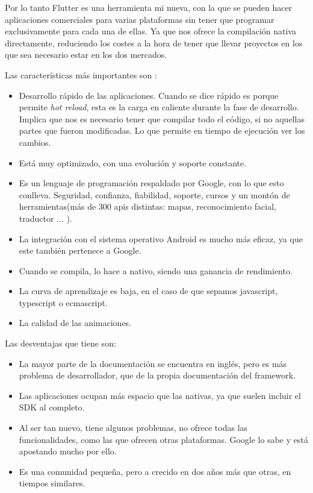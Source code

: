 Por lo tanto Flutter es una herramienta mi nueva, con la que se pueden hacer aplicaciones comerciales para varias plataformas sin tener que programar exclusivamente para cada una de ellas. Ya que nos ofrece la compilación nativa directamente, reduciendo los costes a la hora de tener que llevar proyectos en los que sea necesario estar en los dos mercados.

Las características más importantes son : 

\begin{itemize}
	\item Desarrollo rápido de las aplicaciones. Cuando se dice rápido es porque permite \emph{hot reload}, esta es la carga en caliente durante la fase de desarrollo. Implica que nos es necesario tener que compilar todo el código, si no aquellas partes que fueron modificadas. Lo que permite en tiempo de ejecución ver los cambios.
	\item Está muy optimizado, con una evolución y soporte constante.
	\item Es un lenguaje de programación respaldado por Google, con lo que esto conlleva. Seguridad, confianza, fiabilidad, soporte, cursos y un montón de herramientas(más de 300 apis distintas: mapas, reconocimiento facial, traductor ... ).
	\item La integración con el sistema operativo Android es mucho más eficaz, ya que este también pertenece a Google.
	\item Cuando se compila, lo hace a nativo, siendo una ganancia de rendimiento.
	\item La curva de aprendizaje es baja, en el caso de que sepamos javascript, typescript o ecmascript.
	\item La calidad de las animaciones.
\end{itemize}

Las desventajas que tiene son:
\begin{itemize}
	\item La mayor parte de la documentación se encuentra en inglés, pero es más problema de desarrollador, que de la propia documentación del framework.
	\item Las aplicaciones ocupan más espacio que las nativas, ya que suelen incluir el SDK al completo.
	\item Al ser tan nuevo, tiene algunos problemas, no ofrece todas las funcionalidades, como las que ofrecen otras plataformas. Google lo sabe y está apostando mucho por ello.
	\item Es una comunidad pequeña, pero a crecido en dos años más que otras, en tiempos similares.
\end{itemize}

